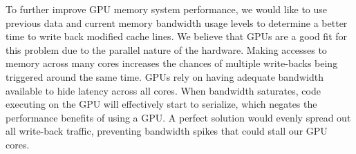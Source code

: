 To further improve GPU memory system performance, we would like to use previous data and current memory bandwidth usage levels to determine a better time to write back modified cache lines. We believe that GPUs are a good fit for this problem due to the parallel nature of the hardware. Making accesses to memory across many cores increases the chances of multiple write-backs being triggered around the same time. GPUs rely on having adequate bandwidth available to hide latency across all cores. When bandwidth saturates, code executing on the GPU will effectively start to serialize, which negates the performance benefits of using a GPU. A perfect solution would evenly spread out all write-back traffic, preventing bandwidth spikes that could stall our GPU cores.
